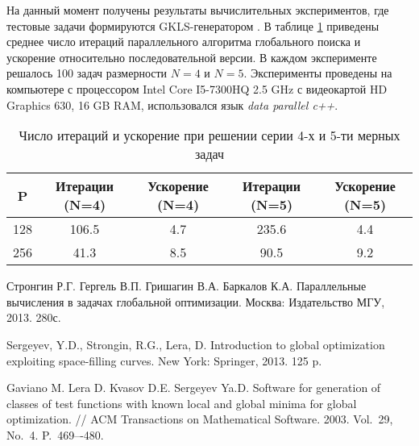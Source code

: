 \documentclass[11pt, oneside, a4paper]{article}
\begin{document}
На данный момент получены результаты вычислительных экспериментов, где тестовые задачи формируются GKLS-генератором \cite{GKLS}. В таблице \ref{table:GKLS_RES} приведены среднее число итераций параллельного алгоритма глобального поиска и ускорение относительно последовательной версии. В каждом эксперименте решалось 100 задач размерности \(N = 4\) и \(N = 5\). Эксперименты проведены на компьютере с процессором Intel Core I5-7300HQ 2.5 GHz с видеокартой HD Graphics 630, 16 GB RAM, использовался язык \textit{data parallel c++}.
\begin{table}[!hbp]
    \centering
    \caption{Число итераций и ускорение при решении серии 4-х и 5-ти мерных задач}
    \begin{tabular}{|c|c|c|c|c|}
    \hline
    P    & Итерации (N=4) & Ускорение (N=4) &         Итерации (N=5) & Ускорение (N=5) \\ \hline
	128 & 106.5   & 4.7      &         235.6   & 4.4      \\ \hline
	256 & 41.3    & 8.5      &         90.5    & 9.2      \\ \hline
	\end{tabular}
    
    \label{table:GKLS_RES}
\end{table}



\begin{biblio}



Стронгин Р.Г. Гергель В.П. Гришагин В.А. Баркалов К.А. Параллельные вычисления
в задачах глобальной оптимизации.
Москва: Издательство МГУ,
2013. 280с.



Sergeyev, Y.D., Strongin, R.G., Lera, D. Introduction to global optimization exploiting space-filling curves. 
New York: Springer, 2013. 125 p.





Gaviano M. Lera D. Kvasov D.E. Sergeyev Ya.D. Software for generation of classes of test functions with known local and global minima for global optimization. // ACM Transactions on Mathematical Software. 2003. Vol.~29, No.~4. P.~469–-480.



\end{biblio}
\end{document}
